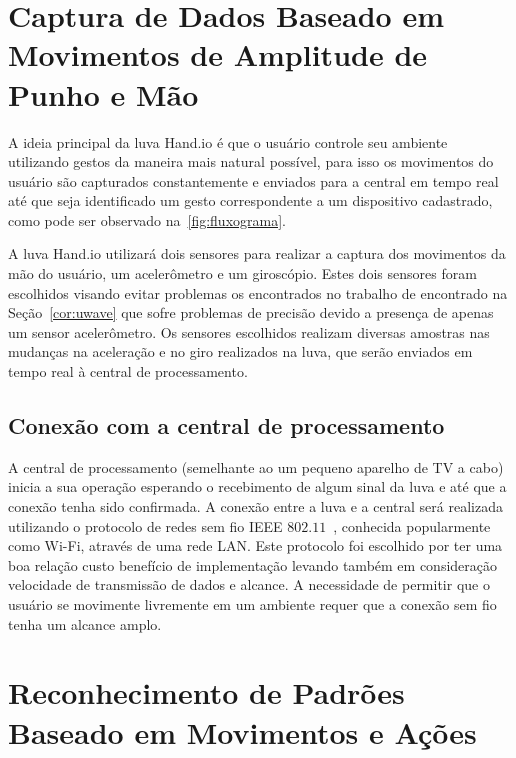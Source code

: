 \section{Captura de Dados Baseado em Movimentos de Amplitude de Punho e Mão}

A ideia principal da luva Hand.io é que o usuário controle seu ambiente utilizando gestos da maneira mais natural possível, para isso os movimentos do usuário são capturados constantemente e enviados para a central em tempo real até que seja identificado um gesto correspondente a um dispositivo cadastrado, como pode ser observado na~\autoref{fig:fluxograma}.

A luva Hand.io utilizará dois sensores para realizar a captura dos movimentos da mão do usuário, um acelerômetro e um giroscópio. Estes dois sensores foram escolhidos visando evitar problemas os encontrados no trabalho de  encontrado na Seção~\ref{cor:uwave} que sofre problemas de precisão devido a presença de apenas um sensor acelerômetro.
% 
Os sensores escolhidos realizam diversas amostras nas mudanças na aceleração e no giro realizados na luva, que serão enviados em tempo real à central de processamento.%



\subsection{Conexão com a central de processamento}

A central de processamento (semelhante ao um pequeno aparelho de TV a cabo) inicia a sua operação esperando o recebimento de algum sinal da luva e até que a conexão tenha sido confirmada.
% 
A conexão entre a luva e a central será realizada utilizando o protocolo de redes sem fio IEEE $802$.$11$~\cite{802.11:1997}, conhecida popularmente como Wi-Fi, através de uma rede LAN. Este protocolo foi escolhido por ter uma boa relação custo benefício de implementação levando também em consideração velocidade de transmissão de dados e alcance. A necessidade de permitir que o usuário se movimente livremente em um ambiente requer que a conexão sem fio tenha um alcance amplo.


\section{Reconhecimento de Padrões Baseado em Movimentos e Ações}

